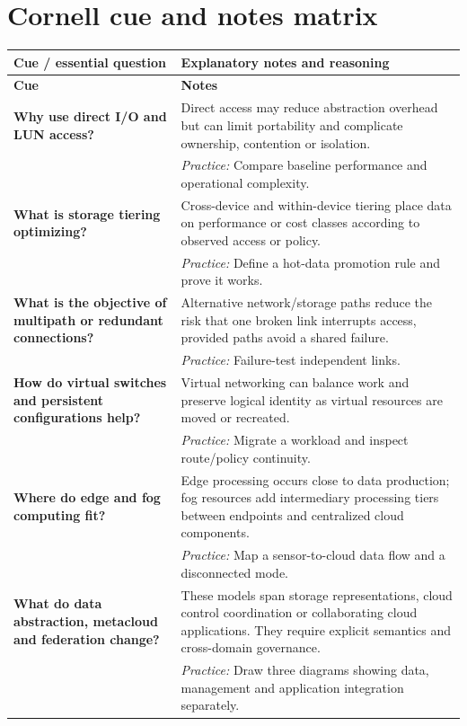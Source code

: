 \documentclass[10pt,letterpaper]{article}
\begin{document}
\section{Cornell cue and notes matrix}
\small\setlength{\LTleft}{0pt}\setlength{\LTright}{0pt plus 1fill}
\begin{longtable}{>{\RaggedRight\arraybackslash}p{}>{\RaggedRight\arraybackslash}p{}}
\toprule\textbf{Cue / essential question}&\textbf{Explanatory notes and reasoning}\\\midrule\endfirsthead\toprule\textbf{Cue}&\textbf{Notes}\\\midrule\endhead
\textbf{Why use direct I/O and LUN access?} & Direct access may reduce abstraction overhead but can limit portability and complicate ownership, contention or isolation.\\[3pt]& \textcolor{petrol}{\emph{Practice:} Compare baseline performance and operational complexity.}\\[8pt]\midrule
\textbf{What is storage tiering optimizing?} & Cross-device and within-device tiering place data on performance or cost classes according to observed access or policy.\\[3pt]& \textcolor{petrol}{\emph{Practice:} Define a hot-data promotion rule and prove it works.}\\[8pt]\midrule
\textbf{What is the objective of multipath or redundant connections?} & Alternative network/storage paths reduce the risk that one broken link interrupts access, provided paths avoid a shared failure.\\[3pt]& \textcolor{petrol}{\emph{Practice:} Failure-test independent links.}\\[8pt]\midrule
\textbf{How do virtual switches and persistent configurations help?} & Virtual networking can balance work and preserve logical identity as virtual resources are moved or recreated.\\[3pt]& \textcolor{petrol}{\emph{Practice:} Migrate a workload and inspect route/policy continuity.}\\[8pt]\midrule
\textbf{Where do edge and fog computing fit?} & Edge processing occurs close to data production; fog resources add intermediary processing tiers between endpoints and centralized cloud components.\\[3pt]& \textcolor{petrol}{\emph{Practice:} Map a sensor-to-cloud data flow and a disconnected mode.}\\[8pt]\midrule
\textbf{What do data abstraction, metacloud and federation change?} & These models span storage representations, cloud control coordination or collaborating cloud applications. They require explicit semantics and cross-domain governance.\\[3pt]& \textcolor{petrol}{\emph{Practice:} Draw three diagrams showing data, management and application integration separately.}\\[8pt]\midrule
\end{longtable}\normalsize
\end{document}
